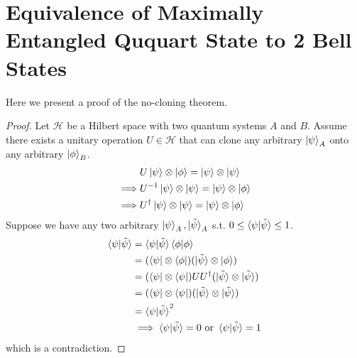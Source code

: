 \appendix
\appendixpage
\addappheadtotoc
\setcounter{equation}{0}
\renewcommand{\theequation}{A.\arabic{equation}}
\section{Equivalence of Maximally Entangled Ququart State to 2 Bell States}
Here we present a proof of the no-cloning theorem.
\begin{proof}
    Let $\mathcal{H}$ be a Hilbert space with two quantum systems $A$ and $B$.
    Assume there exists a unitary operation $U\in\mathcal{H}$ that can clone any arbitrary $\ket{\psi}_A$ onto any arbitrary $\ket{\phi}_B$.
    \begin{align}
        &U\ket{\psi}\otimes\ket{\phi} = \ket{\psi}\otimes\ket{\psi}\\
        \implies &U^{-1}\ket{\psi}\otimes\ket{\psi} = \ket{\psi}\otimes\ket{\phi}\\
        \implies &U^{\dagger}\ket{\psi}\otimes\ket{\psi} = \ket{\psi}\otimes\ket{\phi}
    \end{align}
    Suppose we have any two arbitrary $\ket{\psi}_A,\ket{\tilde{\psi}}_A$ s.t. $0 \leq \braket{\psi|\tilde{\psi}} \leq 1$.
    \begin{align}
        \braket{\psi|\tilde{\psi}} & = \braket{\psi|\tilde{\psi}} \braket{\phi|\phi}\\
        & = (\bra{\psi}\otimes\bra{\phi})(\ket{\tilde{\psi}}\otimes\ket{\phi})\\
        & = (\bra{\psi}\otimes\bra{\psi})UU^{\dagger}(\ket{\tilde{\psi}}\otimes\ket{\tilde{\psi}})\\
        & = (\bra{\psi}\otimes\bra{\psi})(\ket{\tilde{\psi}}\otimes\ket{\tilde{\psi}})\\
        & = \braket{\psi|\tilde{\psi}}^2\\
        &\implies \braket{\psi|\tilde{\psi}} = 0 \text{ or } \braket{\psi|\tilde{\psi}} = 1
    \end{align}
    which is a contradiction.
\end{proof}